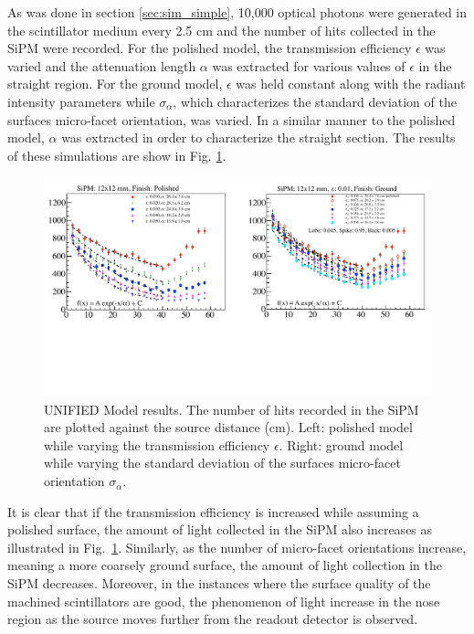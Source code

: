 As was done in section \ref{sec:sim_simple}, 10,000 optical photons were generated in the scintillator medium every 2.5 cm and the number of hits collected in the SiPM were recorded.  For the polished model, the transmission efficiency $\epsilon$ was varied and the attenuation length $\alpha$ was extracted for various values of $\epsilon$ in the straight region.  For the ground model, $\epsilon$ was held constant along with the radiant intensity parameters while $\sigma_{\alpha}$, which characterizes the standard deviation of the surfaces micro-facet orientation, was varied.  In a similar manner to the polished model, $\alpha$ was extracted in order to characterize the straight section.  The results of these simulations are show in Fig. \ref{fig:transm_eff_vs_sig_alpha}.
	\begin{figure}[!htb]
	\centering
	\includegraphics[width=1.0\columnwidth]{simulation/figs/transm_eff_vs_sig_alpha}
	\caption{UNIFIED Model results.  The number of hits recorded in the SiPM are plotted against the source distance (cm).  Left: polished model while varying the transmission efficiency $\epsilon$.  Right: ground model while varying the standard deviation of the surfaces micro-facet orientation $\sigma_{\alpha}$.}
	\label{fig:transm_eff_vs_sig_alpha}
	\end{figure}

It is clear that if the transmission efficiency is increased while assuming a polished surface, the amount of light collected in the SiPM also increases as illustrated in Fig.~\ref{fig:transm_eff_vs_sig_alpha}.  Similarly, as the number of micro-facet orientations increase, meaning a more coarsely ground surface, the amount of light collection in the SiPM decreases.  Moreover, in the instances where the surface quality of the machined scintillators are good, the phenomenon of light increase in the nose region as the source moves further from the readout detector is observed.